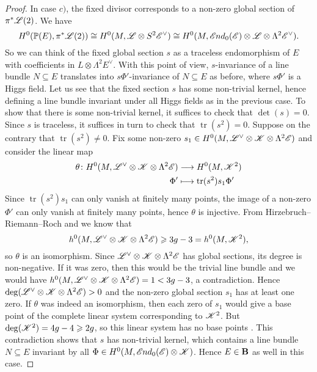 \documentclass[A4paper, 12pt, british, reqno]{amsart}
\DeclareMathOperator{\tr}{tr}
\newcommand{\ot}{\otimes}
\newcommand{\dual}{^{\vee}}
\begin{document}
\begin{lm}
\begin{proof}
	In case $c)$, the fixed divisor corresponds to a non-zero global section of $\pi^{*}\mathscr{L}(2)$.
	We have
	\[ H^{0}(\P(E),\pi^{*}\L(2))\cong H^{0}(M,\L\ot S^{2}\E\dual)\cong H^{0}(M,\sEnd_{0}(\E)\ot \L\ot \Lambda^{2}\E\dual). \]
	So we can think of the fixed global section $s$ as a traceless endomorphism of $E$ with coefficients in $L\ot \Lambda^{2}E\dual$.
	With this point of view, $s$-invariance of a line bundle $N\subseteq E$ translates into $s\Phi'$-invariance of $N\subseteq E$ as before, where $s\Phi'$ is a Higgs field.
	Let us see that the fixed section $s$ has some non-trivial kernel, hence defining a line bundle invariant under all Higgs fields as in the previous case.
	To show that there is some non-trivial kernel, it suffices to check that $\det(s)=0$.
	Since $s$ is traceless, it suffices in turn to check that $\tr(s^{2})=0$.
	Suppose on the contrary that $\tr(s^{2})\neq 0$.
	Fix some non-zero $s_{1}\in H^{0}(M,\L\dual\ot \sK\ot \Lambda^{2}\E)$ and consider the linear map
	\begin{align*}
	    \theta \colon H^{0}(M,\L\dual\ot\sK\ot \Lambda^{2}\E) & \longrightarrow H^{0}(M,\sK^{2}) \\
	    \Phi' & \longmapsto \tr(s^{2})s_{1}\Phi'
	\end{align*}
	Since $\tr(s^{2})s_{1}$ can only vanish at finitely many points, the image of a non-zero $\Phi'$ can only vanish at finitely many points, hence $\theta$ is injective.
	From Hirzebruch--Riemann--Roch and  we know that
	\[ h^{0}(M,\L\dual\ot\sK\ot \Lambda^{2}\E)\geqslant 3g-3=h^{0}(M,\sK^{2}), \]
	so $\theta$ is an isomorphism.
	Since $\L\dual\ot \sK\ot \Lambda^{2}\E$ has global sections, its degree is non-negative.
	If it was zero, then this would be the trivial line bundle and we would have $h^{0}(M,\L\dual\ot\sK\ot\Lambda^{2}\E)=1<3g-3$, a contradiction.
	Hence $\deg(\L\dual\ot\sK\ot\Lambda^{2}\E)>0$ and the non-zero global section $s_{1}$ has at least one zero.
	If $\theta$ was indeed an isomorphism, then each zero of $s_{1}$ would give a base point of the complete linear system corresponding to $\mathscr{K}^{2}$.
	But $\deg(\mathscr{K}^{2})=4g-4\geqslant 2g$, so this linear system has no base points \cite[Corollary IV.3.2]{har77}.
	This contradiction shows that $s$ has non-trivial kernel, which contains a line bundle $N\subseteq E$ invariant by all $\Phi\in H^{0}(M,\sEnd_{0}(\E)\ot \sK)$.
	Hence $E\in \mathbf{B}$ as well in this case.
    \end{proof}
\end{lm}
\end{document}
